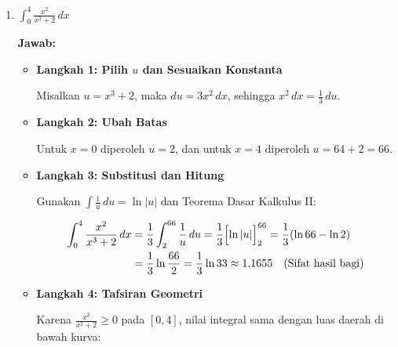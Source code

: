 \documentclass[10pt,a4paper]{article}
\newcounter{eqblock}
\newcommand{\reseteq}{%
  \stepcounter{eqblock}%
  \setcounter{equation}{0}%
  \renewcommand{\theHequation}{\arabic{eqblock}.\arabic{equation}}%
}
\begin{document}
\begin{enumerate}
\begin{enumerate}
\item $\displaystyle\int_0^4 \frac{x^2}{x^3 + 2}\, dx$

\textbf{Jawab:}
\begin{itemize}
\item \textbf{Langkah 1: Pilih $u$ dan Sesuaikan Konstanta}

Misalkan $u = x^3 + 2$, maka $du = 3x^2\, dx$, sehingga $x^2\, dx = \frac{1}{3}\, du$.

\item \textbf{Langkah 2: Ubah Batas}

Untuk $x = 0$ diperoleh $u = 2$, dan untuk $x = 4$ diperoleh $u = 64 + 2 = 66$.

\item \textbf{Langkah 3: Substitusi dan Hitung}

Gunakan $\int \frac{1}{u}\, du = \ln|u|$ dan Teorema Dasar Kalkulus II:
\reseteq
\begin{align}
\int_0^4 \frac{x^2}{x^3 + 2}\, dx &= \frac{1}{3}\int_2^{66} \frac{1}{u}\, du = \frac{1}{3}\Bigl[\ln|u|\Bigr]_2^{66} = \frac{1}{3}(\ln 66 - \ln 2) \\
&= \frac{1}{3}\ln\frac{66}{2} = \frac{1}{3}\ln 33 \approx 1{,}1655 \quad \text{(Sifat hasil bagi)}
\end{align}

\item \textbf{Langkah 4: Tafsiran Geometri}

Karena $\frac{x^2}{x^3 + 2} \ge 0$ pada $[0, 4]$, nilai integral sama dengan luas daerah di bawah kurva:

\begin{center}
\end{center}
\end{itemize}

\end{enumerate}

\end{enumerate}
\end{document}
